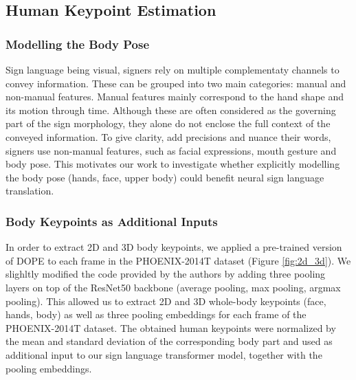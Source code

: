 \documentclass[final]{cvpr}
\begin{document}
\subsection{Human Keypoint Estimation}
\subsubsection{Modelling the Body Pose}
Sign language being visual, signers rely on multiple complementaty channels to convey information. These can be grouped into two main categories: manual and non-manual features. Manual features mainly correspond to the hand shape and its motion through time. Although these are often considered as the governing part of the sign morphology, they alone do not enclose the full context of the conveyed information. To give clarity, add precisions and nuance their words, signers use non-manual features, such as facial expressions, mouth gesture and body pose. This motivates our work to investigate whether explicitly modelling the body pose (hands, face, upper body) could benefit neural sign language translation.
\subsubsection{Body Keypoints as Additional Inputs}
In order to extract 2D and 3D body keypoints, we applied a pre-trained version of DOPE \cite{dope} to each frame in the PHOENIX-2014T dataset (Figure \ref{fig:2d_3d}). We slighltly modified the code provided by the authors by adding three pooling layers on top of the ResNet50 backbone (average pooling, max pooling, argmax pooling). This allowed us to extract 2D and 3D whole-body keypoints (face, hands, body) as well as three pooling embeddings for each frame of the PHOENIX-2014T dataset. The obtained human keypoints were normalized by the mean and standard deviation of the corresponding body part and used as additional input to our sign language transformer model, together with the pooling embeddings.
\end{document}
